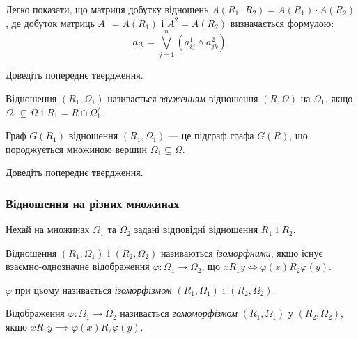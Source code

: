\begin{proposition}
	Легко показати, що матриця добутку відношень $A(R_1 \cdot R_2) = A(R_1) \cdot A(R_2)$, де добуток матриць $A^1 = A(R_1)$ і $A^2 = A(R_2)$ визначається формулою: \begin{equation}a_{ik} = \bigvee\limits_{j = 1}^n \left( a_{ij}^1 \land a_{jk}^2 \right).\end{equation}
\end{proposition}

\begin{exercise}
	Доведіть попереднє твердження.
\end{exercise}

\begin{definition}
	Відношення $(R_1, \Omega_1)$ називається \textit{звуженням} відношення $(R, \Omega)$ на $\Omega_1$, якщо $\Omega_1 \subseteq \Omega$ і $R_1 = R \cap \Omega_1^2$.
\end{definition}

\begin{proposition}
	Граф $G(R_1)$ відношення $(R_1, \Omega_1)$ --- це підграф графа $G(R)$, що породжується множиною вершин $\Omega_1 \subseteq \Omega$.
\end{proposition}

\begin{exercise}
	Доведіть попереднє твердження.
\end{exercise}

\subsubsection{Відношення на різних множинах}

Нехай на множинах $\Omega_1$ та $\Omega_2$ задані відповідні відношення $R_1$ і $R_2$.

\begin{definition}
	Відношення $(R_1, \Omega_1)$ і $(R_2, \Omega_2)$ називаються \textit{ізоморфними}, якщо існує взаємно-однозначне відображення $\varphi: \Omega_1 \to \Omega_2$, що $x R_1 y \iff \varphi(x) R_2 \varphi(y)$.
\end{definition}

\begin{definition}[ізоморфізму]
	$\varphi$ при цьому називається \textit{ізоморфізмом} $(R_1, \Omega_1)$ і $(R_2, \Omega_2)$.
\end{definition}

\begin{definition}[гомоморфізму]
	Відображення $\varphi: \Omega_1 \to \Omega_2$ називається \textit{гомоморфізмом} $(R_1, \Omega_1)$ у $(R_2, \Omega_2)$, якщо $x R_1 y \implies \varphi(x) R_2 \varphi(y)$.
\end{definition}

